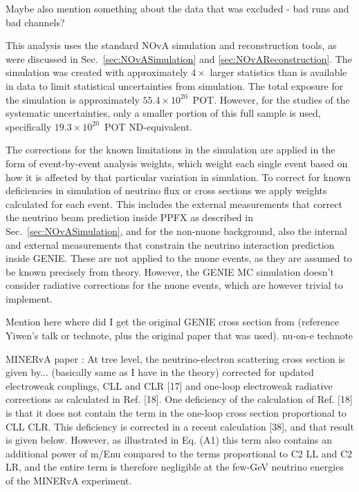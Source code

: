 Maybe also mention something about the data that was excluded - bad runs and bad channels?

This analysis uses the standard \gls{NOvA} simulation and reconstruction tools, as were discussed in Sec.~\ref{sec:NOvASimulation} and \ref{sec:NOvAReconstruction}. The simulation was created with approximately $4\times$ larger statistics than is available in data to limit statistical uncertainties from simulation. The total exposure for the simulation is approximately $55.4\times10^{20}$~\gls{POT}. However, for the studies of the systematic uncertainties, only a smaller portion of this full sample is used, specifically $19.3\times10^{20}$~\gls{POT} \gls{ND}-equivalent.

The corrections for the known limitations in the simulation are applied in the form of event-by-event analysis weights, which weight each single event based on how it is affected by that particular variation in simulation. To correct for known deficiencies in simulation of neutrino flux or cross sections we apply weights calculated for each event. This includes the external measurements that correct the neutrino beam prediction inside \gls{PPFX} as described in Sec.~\ref{sec:NOvASimulation}, and for the non-\gls{nuone} background, also the internal and external measurements that constrain the neutrino interaction prediction inside GENIE. These are not applied to the \gls{nuone} events, as they are assumed to be known precisely from theory.  However, the GENIE \gls{MC} simulation doesn't consider radiative corrections for the \gls{nuone} events, which are however trivial to implement.

Mention here where did I get the original GENIE cross section from (reference Yiwen's talk or technote, plus the original paper that was used). nu-on-e technote\cite{NOVA-doc-56383}


MINERvA paper \cite{MinervaNuoneFluxConstraint2019.pdf}: At tree level, the neutrino-electron scattering cross section is given by... (basically same as I have in the theory) corrected for updated electroweak couplings, CLL and CLR [17] and one-loop electroweak radiative corrections as calculated in Ref. [18]. One deficiency of the calculation of Ref. [18] is that it does not contain the term in the one-loop cross section proportional to CLL CLR. This deficiency is corrected in a recent calculation [38], and that result is given below. However, as illustrated in Eq. (A1) this term also contains an additional power of m/Enu compared to the terms proportional to C2 LL and C2 LR, and the entire term is therefore negligible at the few-GeV neutrino energies of the MINERvA experiment.


